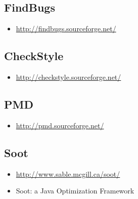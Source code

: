 \subsection{FindBugs}
\begin{itemize}
\item \href{http://findbugs.sourceforge.net/}{http://findbugs.sourceforge.net/}
\end{itemize}

\subsection{CheckStyle}
\begin{itemize}
\item \href{http://checkstyle.sourceforge.net/}{http://checkstyle.sourceforge.net/}
\end{itemize}

\subsection{PMD}
\begin{itemize}
\item \href{http://pmd.sourceforge.net/}{http://pmd.sourceforge.net/}
\end{itemize}

\subsection{Soot}
\begin{itemize}
\item \href{http://www.sable.mcgill.ca/soot/}{http://www.sable.mcgill.ca/soot/}
\item Soot: a Java Optimization Framework
\end{itemize}

